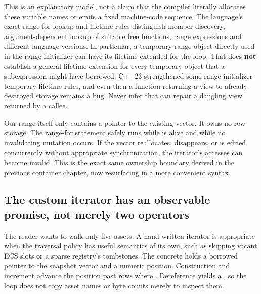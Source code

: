 This is an explanatory model, not a claim that the compiler literally allocates these variable names or emits a fixed machine-code sequence. The language's exact range-for lookup and lifetime rules distinguish member  discovery, argument-dependent lookup of suitable free functions, range expressions and different language versions. In particular, a temporary range object directly used in the range initializer can have its lifetime extended for the loop. That does \textbf{not} establish a general lifetime extension for every temporary object that a subexpression might have borrowed. C++23 strengthened some range-initializer temporary-lifetime rules, and even then a function returning a view to already destroyed storage remains a bug. Never infer that  can repair a dangling view returned by a callee.

Our  range itself only contains a pointer to the existing vector. It owns no row storage. The range-for statement safely runs while  is alive and while no invalidating mutation occurs. If the vector reallocates, disappears, or is edited concurrently without appropriate synchronization, the iterator's accesses can become invalid. This is the exact same ownership boundary derived in the previous container chapter, now resurfacing in a more convenient syntax.

\subsection{The custom iterator has an observable promise, not merely two operators}\label{01-foundations-i-ch006-the-custom-iterator-has-an-observable-promise-not-merely-two-operators}

\hypertarget{01-foundations-i-ch006-the-custom-iterator-has-an-observable-promise-not-merely-two-operators}{}

The reader wants to walk only live assets. A hand-written iterator is appropriate when the traversal policy has useful semantics of its own, such as skipping vacant ECS slots or a sparse registry's tombstones. The concrete  holds a borrowed pointer to the snapshot vector and a numeric position. Construction and increment advance the position past rows where . Dereference yields a , so the loop does not copy asset names or byte counts merely to inspect them.


